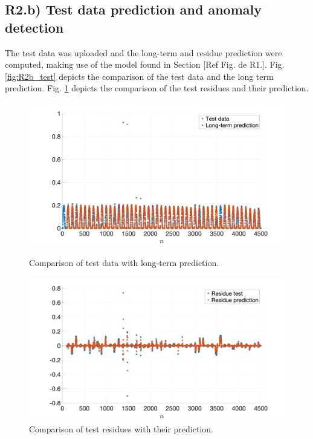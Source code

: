 \documentclass[]{scrartcl}
\begin{document}
\subsection{R2.b) Test data prediction and anomaly detection}\label{sec:r2b}
The test data was uploaded and the long-term and residue prediction were computed, making use of the model found in Section [Ref Fig. de R1.]. Fig. \ref{fig:R2b_test} depicts the comparison of the test data and the long term prediction. Fig. \ref{fig:R2b_residual} depicts the comparison of the test residues and their prediction. 
\begin{figure}[htbp]
	\centering
	\begin{minipage}[b]{.49\textwidth}
		\centering
		\includegraphics[width= 1.1\textwidth]{figures/R2b_test.png}
		\caption{Comparison of test data with long-term prediction.}
		\label{fig:R2b_test}
	\end{minipage}
	\hfill
	\begin{minipage}[b]{.49\textwidth}
		\centering
		\includegraphics[width= 1.1\textwidth]{figures/R2b_residual.png}
		\caption{Comparison of test residues with their  prediction.}
		\label{fig:R2b_residual}
	\end{minipage}
\end{figure}
\end{document}
